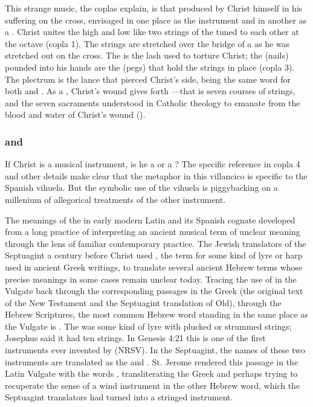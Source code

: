 This strange music, the coplas explain, is that produced by Christ himself in
his suffering on the cross, envisaged in one place as the instrument
 and in another as a .
Christ unites the high and low like two strings of the  tuned to
each other at the octave (copla 1).  
The strings are stretched over the bridge of a  as he was
stretched out on the cross.
The  is the lash used to torture Christ; the 
(nails) pounded into his hands are the  (pegs) that hold the
strings in place (copla 3).
The plectrum is the lance that pierced Christ's side,  being the
same word for both  and .
As a , Christ's wound gives forth ---that is
seven courses of strings, and the seven sacraments understood in Catholic
theology to emanate from the blood and water of Christ's wound ().

\subsubsection{ and }

If Christ is a musical instrument, is he a  or a ?  
The specific reference in copla 4 and other details make clear that the
metaphor in this villancico is specific to the Spanish 
vihuela.
But the symbolic use of the vihuela is piggybacking on a millenium of
allegorical treatments of the other instrument.

The meanings of the  in early modern Latin and its Spanish
cognate  developed from a long practice of interpreting an ancient
musical term of unclear meaning through the lens of familiar contemporary
practice.
The Jewish translators of the Septuagint a century before Christ used
, the term for some kind of lyre or harp used in ancient Greek
writings, to translate several ancient Hebrew terms whose precise meanings in
some cases remain unclear today.%
    \Autocite{Lawergren:Lyres}
Tracing the use of  in the Vulgate back through the corresponding
passages in the Greek (the original text of the New Testament and the
Septuagint translation of Old), through the Hebrew Scriptures, the most common
Hebrew word standing in the same place as the Vulgate  is
.
The  was some kind of lyre with plucked or strummed strings;
Josephus said it had ten strings.%
    \Autocite[]{Bromily:BibleEncyclopedia}
In Genesis 4:21 this is one of the first instruments ever invented by
 (NRSV).
In the Septuagint, the names of these two instruments are translated as the
 and .
St. Jerome rendered this passage in the Latin Vulgate with the words
, transliterating the Greek  and
perhaps trying to recuperate the sense of a wind instrument in the other Hebrew
word, which the Septuagint translators had turned into a stringed instrument.

